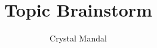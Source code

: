 \documentclass[14pt, letterpaper]{article}
\title{ \vspace*{-72pt} Topic Brainstorm }
\author{Crystal Mandal}
\date{}
\begin{document}
\nocite{*}

\printbibliography
\end{document}
